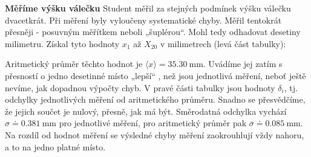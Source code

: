 \begin{mdframed}[style=mdexam]
  \begin{example}\label{mai:exam077}
    \textbf{Měříme výšku válečku}\newline
    Student měřil za stejných podmínek výšku válečku dvacetkrát. Při měření byly vyloučeny
    systematické chyby. Měřil tentokrát přesněji - posuvným měřítkem neboli „šuplérou“. Mohl tedy
    odhadovat desetiny milimetru. Získal tyto hodnoty \(x_1\) až \(X_{20}\) v milimetrech (levá část
    tabulky):
    
    {\centering
    \par}
    \vspace{\baselineskip}
    Aritmetický průměr těchto hodnot je \(\langle x\rangle = \qty{35.30}{\mm}\). Uvádíme jej zatím s
    přesností o jedno desetinné místo „lepší“ , než jsou jednotlivá měření, neboť ještě nevíme, jak
    dopadnou výpočty chyb. V pravé části tabulky jsou hodnoty \(\delta_i\), tj. odchylky
    jednotlivých měření od aritmetického průměru. Snadno se přesvědčíme, že jejich součet je nulový,
    přesně, jak má být. Směrodatná odchylka vychází \(\sigma \doteq \qty{0.381}{\mm}\) pro jednotlivé
    měření, pro aritmetický průměr pak \(\overline{\sigma} \doteq \qty{0.085}{\mm}\). Na rozdíl od
    hodnot měření se výsledné chyby měření zaokrouhlují vždy nahoru, a to na jedno platné místo.

\end{example}
\end{mdframed}
